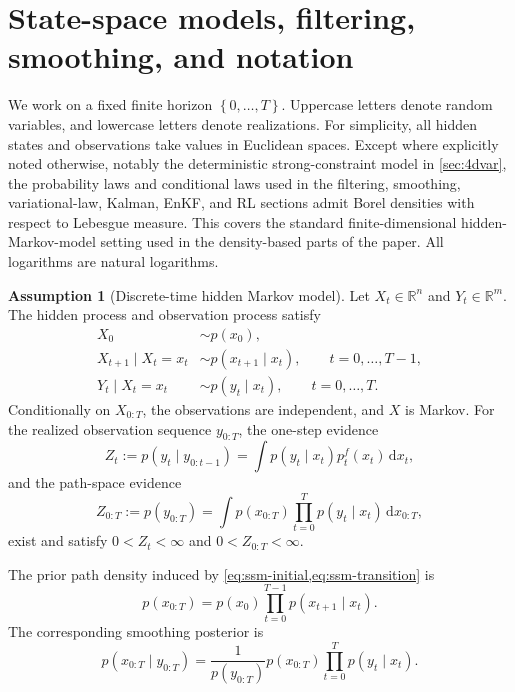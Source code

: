 \documentclass[11pt]{article}
\newcommand{\R}{\mathbb{R}}
\newcommand{\dd}{\,\mathrm d}
\newcommand{\xtraj}{x_{0:T}}
\newcommand{\ytraj}{y_{0:T}}
\newcommand{\Xtraj}{X_{0:T}}
\newcommand{\set}[1]{\left\{ #1 \right\}}
\numberwithin{equation}{section}
\theoremstyle{plain}
\theoremstyle{definition}
\newtheorem{assumption}[theorem]{Assumption}
\theoremstyle{remark}
\begin{document}
\section{State-space models, filtering, smoothing, and notation}
\label{sec:state-space}

We work on a fixed finite horizon $\set{0,\dots,T}$. Uppercase letters denote random variables, and lowercase letters denote realizations. For simplicity, all hidden states and observations take values in Euclidean spaces. Except where explicitly noted otherwise, notably the deterministic strong-constraint model in \cref{sec:4dvar}, the probability laws and conditional laws used in the filtering, smoothing, variational-law, Kalman, EnKF, and RL sections admit Borel densities with respect to Lebesgue measure. This covers the standard finite-dimensional hidden-Markov-model setting used in the density-based parts of the paper. All logarithms are natural logarithms.

\begin{assumption}[Discrete-time hidden Markov model]
\label{ass:ssm}
Let $X_t\in\R^n$ and $Y_t\in\R^m$. The hidden process and observation process satisfy
\begin{align}
X_0 &\sim p(x_0), \label{eq:ssm-initial}\\
X_{t+1}\mid X_t=x_t &\sim p(x_{t+1}\mid x_t), \qquad t=0,\dots,T-1, \label{eq:ssm-transition}\\
Y_t\mid X_t=x_t &\sim p(y_t\mid x_t), \qquad t=0,\dots,T. \label{eq:ssm-observation}
\end{align}
Conditionally on $\Xtraj$, the observations are independent, and $X$ is Markov. For the realized observation sequence $\ytraj$, the one-step evidence
\begin{equation}
Z_t := p(y_t\mid y_{0:t-1}) = \int p(y_t\mid x_t)p_t^f(x_t)\dd x_t,
\end{equation}
and the path-space evidence
\begin{equation}
Z_{0:T} := p(\ytraj) = \int p(\xtraj)\prod_{t=0}^{T} p(y_t\mid x_t)\dd \xtraj,
\end{equation}
exist and satisfy $0<Z_t<\infty$ and $0<Z_{0:T}<\infty$.
\end{assumption}

The prior path density induced by \cref{eq:ssm-initial,eq:ssm-transition} is
\begin{equation}
p(\xtraj) = p(x_0)\prod_{t=0}^{T-1} p(x_{t+1}\mid x_t).
\label{eq:path-prior}
\end{equation}
The corresponding smoothing posterior is
\begin{equation}
p(\xtraj\mid \ytraj)
=
\frac{1}{p(\ytraj)}
p(\xtraj)\prod_{t=0}^{T} p(y_t\mid x_t).
\label{eq:path-posterior}
\end{equation}
\end{document}
